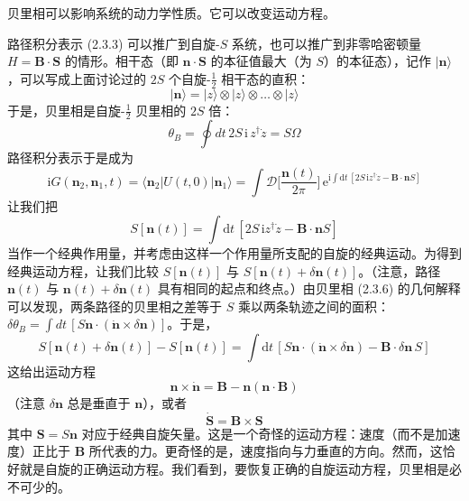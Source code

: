 \begin{keypoints}
\item 贝里相可以影响系统的动力学性质。它可以改变运动方程。
\end{keypoints}

路径积分表示 (2.3.3) 可以推广到自旋-$S$ 系统，也可以推广到非零哈密顿量 $H = \pmb{B}\cdot\pmb{S}$ 的情形。相干态（即 $\pmb{n}\cdot\pmb{S}$ 的本征值最大（为 $S$）的本征态），记作 $|\pmb{n}\rangle$，可以写成上面讨论过的 $2S$ 个自旋-$\frac{1}{2}$ 相干态的直积：
\begin{equation*}
|\pmb{n}\rangle = |z\rangle \otimes |z\rangle \otimes \dots \otimes |z\rangle
\end{equation*}
于是，贝里相是自旋-$\frac{1}{2}$ 贝里相的 $2S$ 倍：
\begin{equation*}
\theta_B = \oint dt\, 2S\,\mathrm{i}\, z^{\dagger}\dot{z} = S\Omega\tag{2.3.6}
\end{equation*}
路径积分表示于是成为
\begin{equation*}
\mathrm{i}G(\pmb{n}_2, \pmb{n}_1, t) = \langle \pmb{n}_2 | U(t,0) | \pmb{n}_1 \rangle = \int \mathcal{D}\Big[\frac{\pmb{n}(t)}{2\pi}\Big]\, \mathrm{e}^{\mathrm{i}\int \mathrm{d}t\, [2S\,\mathrm{i}z^{\dagger}\dot{z} - \pmb{B}\cdot\pmb{n}S]}\tag{2.3.7}
\end{equation*}
让我们把
\begin{equation*}
S[\pmb{n}(t)] = \int \mathrm{d}t\, [2S\,\mathrm{i}z^{\dagger}\dot{z} - \pmb{B}\cdot\pmb{n}S]\tag{2.3.8}
\end{equation*}
当作一个经典作用量，并考虑由这样一个作用量所支配的自旋的经典运动。为得到经典运动方程，让我们比较 $S[\pmb{n}(t)]$ 与 $S[\pmb{n}(t)+\delta\pmb{n}(t)]$。（注意，路径 $\pmb{n}(t)$ 与 $\pmb{n}(t)+\delta\pmb{n}(t)$ 具有相同的起点和终点。）由贝里相 (2.3.6) 的几何解释可以发现，两条路径的贝里相之差等于 $S$ 乘以两条轨迹之间的面积：$\delta\theta_B = \int dt\, [S\pmb{n}\cdot(\dot{\pmb{n}}\times\delta\pmb{n})]$。于是，
\begin{equation*}
S[\pmb{n}(t)+\delta\pmb{n}(t)] - S[\pmb{n}(t)] = \int \mathrm{d}t\, [S\pmb{n}\cdot(\dot{\pmb{n}}\times\delta\pmb{n}) - \pmb{B}\cdot\delta\pmb{n}\,S]
\end{equation*}
这给出运动方程
\begin{equation*}
\pmb{n}\times\dot{\pmb{n}} = \pmb{B} - \pmb{n}(\pmb{n}\cdot\pmb{B})
\end{equation*}
（注意 $\delta\pmb{n}$ 总是垂直于 $\pmb{n}$），或者
\begin{equation*}
\dot{\pmb{S}} = \pmb{B}\times\pmb{S}\tag{2.3.9}
\end{equation*}
其中 $\pmb{S} = S\pmb{n}$ 对应于经典自旋矢量。这是一个奇怪的运动方程：速度（而不是加速度）正比于 $\pmb{B}$ 所代表的力。更奇怪的是，速度指向与力垂直的方向。然而，这恰好就是自旋的正确运动方程。我们看到，要恢复正确的自旋运动方程，贝里相是必不可少的。

